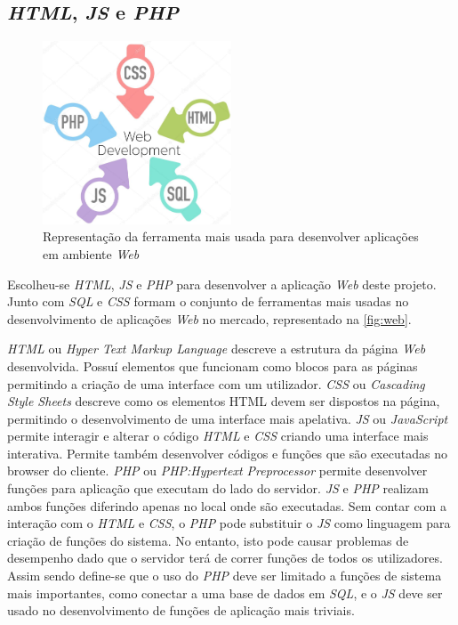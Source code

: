 \documentclass[11pt,twoside,a4paper]{report}
\begin{document}
\subsection{\textit{HTML}, \textit{JS} e \textit{PHP}}
\begin{figure}[H]
	\begin{center}
		\includegraphics[width=0.5\textwidth]{web} %
		\caption{Representação da ferramenta mais usada para desenvolver aplicações em ambiente \textit{Web}}
		\label{fig:web}
	\end{center}
\end{figure}
Escolheu-se \textit{HTML}, \textit{JS} e \textit{PHP} para desenvolver a aplicação \textit{Web} deste projeto. Junto com \textit{SQL} e \textit{CSS} formam o conjunto de ferramentas mais usadas no desenvolvimento de aplicações \textit{Web} no mercado, representado na \autoref{fig:web}.\par 
\textit{HTML} ou \textit{Hyper Text Markup Language} descreve a estrutura da página \textit{Web} desenvolvida. Possuí elementos que funcionam como blocos para as páginas permitindo a criação de uma interface com um utilizador. \textit{CSS} ou \textit{Cascading Style Sheets} descreve como os elementos HTML devem ser dispostos na página, permitindo o desenvolvimento de uma interface mais apelativa. \textit{JS} ou \textit{JavaScript} permite interagir e alterar o código \textit{HTML} e \textit{CSS} criando uma interface mais interativa. Permite também desenvolver códigos e funções que são executadas no browser do cliente. \textit{PHP} ou \textit{PHP:Hypertext Preprocessor} permite desenvolver funções para aplicação que executam do lado do servidor. \textit{JS} e \textit{PHP} realizam ambos funções diferindo apenas no local onde são executadas. Sem contar com a interação com o \textit{HTML} e \textit{CSS}, o \textit{PHP} pode substituir o \textit{JS} como linguagem para criação de funções do sistema. No entanto, isto pode causar problemas de desempenho dado que o servidor terá de correr funções de todos os utilizadores. Assim sendo define-se que o uso do \textit{PHP} deve ser limitado a funções de sistema mais importantes, como conectar a uma base de dados em \textit{SQL}, e o \textit{JS} deve ser usado no desenvolvimento de funções de aplicação mais triviais.
\end{document}
